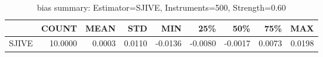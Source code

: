 \begin{table}[ht]
\centering
\caption{bias summary: Estimator=SJIVE, Instruments=500, Strength=0.60}
\begin{tabular}{lrrrrrrrr}
\toprule
 & COUNT & MEAN & STD & MIN & 25\% & 50\% & 75\% & MAX \\
\midrule
SJIVE & 10.0000 & 0.0003 & 0.0110 & -0.0136 & -0.0080 & -0.0017 & 0.0073 & 0.0198 \\
\bottomrule
\end{tabular}
\end{table}
